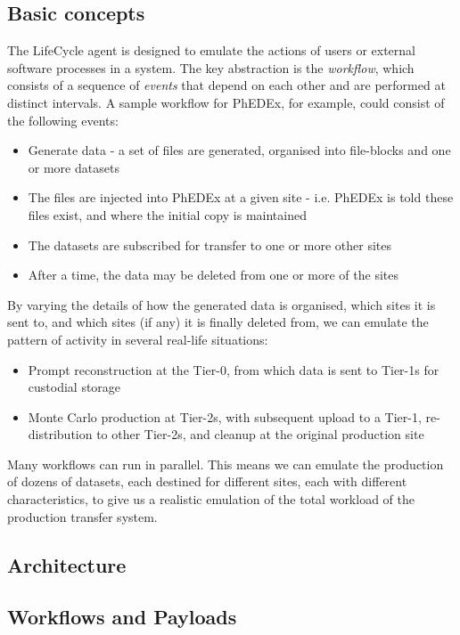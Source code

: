 \subsection{Basic concepts}
The LifeCycle agent is designed to emulate the actions of users or external software processes in 
a system. The key abstraction is the {\it workflow}, which consists of a sequence of {\it events} 
that depend on each other and are performed at distinct intervals. A sample workflow for PhEDEx, 
for example, could consist of the following events:

\begin{itemize}
  \item Generate data - a set of files are generated, organised into file-blocks and one 
or more datasets
  \item The files are injected into PhEDEx at a given site - i.e. PhEDEx is told these files 
exist, and where the initial copy is maintained
  \item The datasets are subscribed for transfer to one or more other sites
  \item After a time, the data may be deleted from one or more of the sites
\end{itemize}

By varying the details of how the generated data is organised, which sites it is sent to, and 
which sites (if any) it is finally deleted from, we can emulate the pattern of activity in several 
real-life situations:

\begin{itemize}
  \item Prompt reconstruction at the Tier-0, from which data is sent to Tier-1s for custodial 
storage
  \item Monte Carlo production at Tier-2s, with subsequent upload to a Tier-1, re-distribution to 
other Tier-2s, and cleanup at the original production site
\end{itemize}

Many workflows can run in parallel. This means we can emulate the production of dozens of 
datasets, each destined for different sites, each with different characteristics, to give us a 
realistic emulation of the total workload of the production transfer system.

\subsection{Architecture}
\subsection{Workflows and Payloads}

